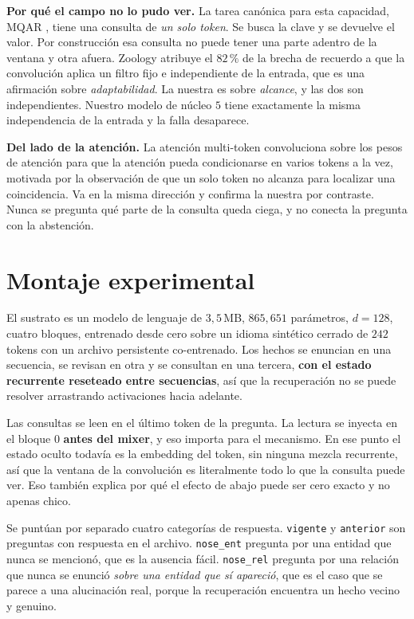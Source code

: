 \documentclass[11pt,a4paper]{article}
\begin{document}
\textbf{Por qué el campo no lo pudo ver.} La tarea canónica para esta capacidad, MQAR
\citep{zoology}, tiene una consulta de \emph{un solo token}. Se busca la clave y se devuelve el valor.
Por construcción esa consulta no puede tener una parte adentro de la ventana y otra afuera. Zoology
atribuye el $82\,\%$ de la brecha de recuerdo a que la convolución aplica un filtro fijo e
independiente de la entrada, que es una afirmación sobre \emph{adaptabilidad}. La nuestra es sobre
\emph{alcance}, y las dos son independientes. Nuestro modelo de núcleo $5$ tiene exactamente la misma
independencia de la entrada y la falla desaparece.

\textbf{Del lado de la atención.} La atención multi-token \citep{mta} convoluciona sobre los pesos de
atención para que la atención pueda condicionarse en varios tokens a la vez, motivada por la
observación de que un solo token no alcanza para localizar una coincidencia. Va en la misma dirección
y confirma la nuestra por contraste. Nunca se pregunta qué parte de la consulta queda ciega, y no
conecta la pregunta con la abstención.

\section{Montaje experimental}

El sustrato es un modelo de lenguaje de $3{,}5$\,MB, $865{,}651$ parámetros, $d=128$, cuatro bloques,
entrenado desde cero sobre un idioma sintético cerrado de $242$ tokens con un archivo persistente
co-entrenado. Los hechos se enuncian en una secuencia, se revisan en otra y se consultan en una
tercera, \textbf{con el estado recurrente reseteado entre secuencias}, así que la recuperación no se
puede resolver arrastrando activaciones hacia adelante.

Las consultas se leen en el último token de la pregunta. La lectura se inyecta en el bloque $0$
\textbf{antes del mixer}, y eso importa para el mecanismo. En ese punto el estado oculto todavía es la
embedding del token, sin ninguna mezcla recurrente, así que la ventana de la convolución es
literalmente todo lo que la consulta puede ver. Eso también explica por qué el efecto de abajo puede
ser cero exacto y no apenas chico.

Se puntúan por separado cuatro categorías de respuesta. \texttt{vigente} y \texttt{anterior} son
preguntas con respuesta en el archivo. \texttt{nose\_ent} pregunta por una entidad que nunca se
mencionó, que es la ausencia fácil. \texttt{nose\_rel} pregunta por una relación que nunca se enunció
\emph{sobre una entidad que sí apareció}, que es el caso que se parece a una alucinación real, porque
la recuperación encuentra un hecho vecino y genuino.
\end{document}
